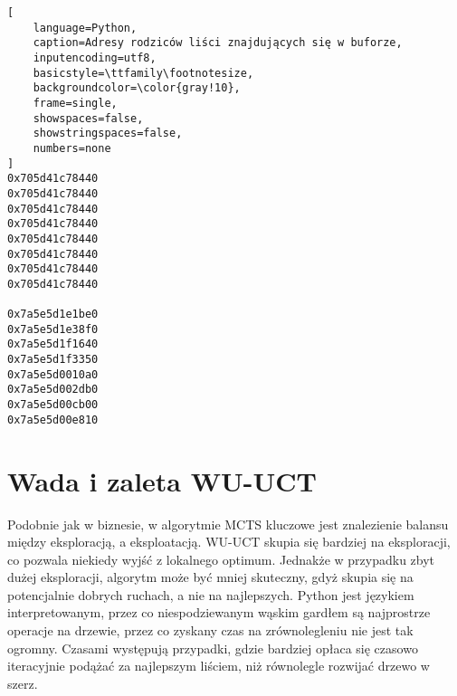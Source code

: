 \begin{lstlisting}[
    language=Python,
    caption=Adresy rodziców liści znajdujących się w buforze,
    inputencoding=utf8,
    basicstyle=\ttfamily\footnotesize,
    backgroundcolor=\color{gray!10},
    frame=single,
    showspaces=false,
    showstringspaces=false,
    numbers=none
]
0x705d41c78440
0x705d41c78440
0x705d41c78440
0x705d41c78440
0x705d41c78440
0x705d41c78440
0x705d41c78440
0x705d41c78440

0x7a5e5d1e1be0
0x7a5e5d1e38f0
0x7a5e5d1f1640
0x7a5e5d1f3350
0x7a5e5d0010a0
0x7a5e5d002db0
0x7a5e5d00cb00
0x7a5e5d00e810
\end{lstlisting}

\section*{Wada i zaleta WU-UCT}
Podobnie jak w biznesie, w algorytmie MCTS kluczowe jest znalezienie balansu między eksploracją, a eksploatacją. WU-UCT skupia się bardziej na eksploracji, co pozwala niekiedy wyjść z lokalnego optimum. Jednakże w przypadku zbyt dużej eksploracji, algorytm może być mniej skuteczny, gdyż skupia się na potencjalnie dobrych ruchach, a nie na najlepszych. Python jest językiem interpretowanym, przez co niespodziewanym wąskim gardłem są najprostrze operacje na drzewie, przez co zyskany czas na zrównolegleniu nie jest tak ogromny. Czasami występują przypadki, gdzie bardziej opłaca się czasowo iteracyjnie podążać za najlepszym liściem, niż równolegle rozwijać drzewo w szerz.
